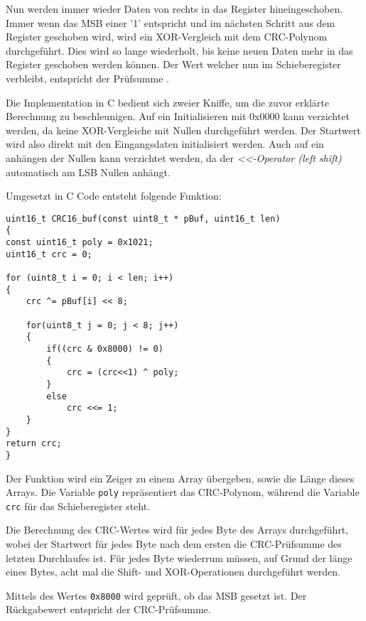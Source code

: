 \smallskip

Nun werden immer wieder Daten von rechts in das Register hineingeschoben. Immer wenn das \ac{MSB} einer '1' entspricht und im nächsten Schritt aus dem Register
geschoben wird, wird ein XOR-Vergleich mit dem CRC-Polynom durchgeführt. Dies wird so lange wiederholt, bis keine neuen Daten mehr in das Register geschoben werden können.
Der Wert welcher nun im Schieberegister verbleibt, entspricht der Prüfsumme \citep{IK_VL}.

\smallskip

Die Implementation in C bedient sich zweier Kniffe, um die zuvor erklärte Berechnung zu beschleunigen. Auf ein Initialisieren mit 0x0000 kann verzichtet werden,
da keine XOR-Vergleiche mit Nullen durchgeführt werden. Der Startwert wird also direkt mit den Eingangsdaten initialisiert werden. Auch auf ein anhängen der Nullen 
kann verzichtet werden, da der \textit{<<-Operator (left shift)} automatisch am \ac{LSB} Nullen anhängt. 

\newpage

Umgesetzt in C Code entsteht folgende Funktion: 

\begin{lstlisting}[caption={\textit{Berechnung CRC16}}]
uint16_t CRC16_buf(const uint8_t * pBuf, uint16_t len) 
{
const uint16_t poly = 0x1021;
uint16_t crc = 0;

for (uint8_t i = 0; i < len; i++)
{
    crc ^= pBuf[i] << 8; 

    for(uint8_t j = 0; j < 8; j++)
    {
        if((crc & 0x8000) != 0) 
        {
            crc = (crc<<1) ^ poly; 
        }
        else
            crc <<= 1;
    }
}
return crc;
}
\end{lstlisting}

Der Funktion wird ein Zeiger zu einem Array übergeben, sowie die Länge dieses Arrays. Die Variable \lstinline!poly! repräsentiert das CRC-Polynom,
während die Variable \lstinline!crc! für das Schieberegister steht.

\smallskip

Die Berechnung des CRC-Wertes wird für jedes Byte des Arrays durchgeführt, wobei der Startwert für jedes Byte nach dem ersten die CRC-Prüfsumme des 
letzten Durchlaufes ist. Für jedes Byte wiederrum müssen, auf Grund der länge eines Bytes, acht mal die Shift- und XOR-Operationen durchgeführt werden.

\smallskip

Mittels des Wertes \lstinline!0x8000! wird geprüft, ob das \ac{MSB} gesetzt ist. Der Rückgabewert entspricht der CRC-Prüfsumme. 

